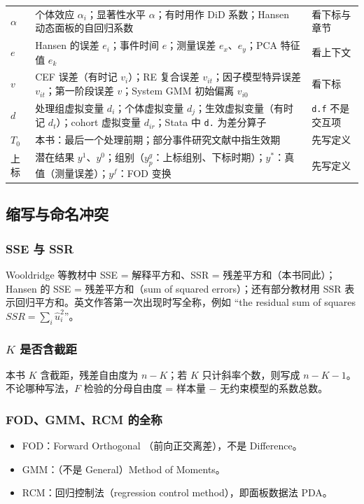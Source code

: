 {\begin{longtable}{@{}>{\raggedright\arraybackslash\small}p{1.3cm}>{\raggedright\arraybackslash\small}p{10.0cm}>{\raggedright\arraybackslash\small}p{3.8cm}@{}}
$\alpha$ & 个体效应 $\alpha_i$；显著性水平 $\alpha$；有时用作 DiD 系数；Hansen 动态面板的自回归系数 & 看下标与章节\\
\addlinespace[1pt]
$e$ & Hansen 的误差 $e_i$；事件时间 $e$；测量误差 $e_x$、$e_y$；PCA 特征值 $e_k$ & 看上下文\\
\addlinespace[1pt]
$v$ & CEF 误差（有时记 $v_i$）；RE 复合误差 $v_{it}$；因子模型特异误差 $v_{it}$；第一阶段误差 $v$；System GMM 初始偏离 $v_{i0}$ & 看下标\\
\addlinespace[1pt]
$d$ & 处理组虚拟变量 $d_i$；个体虚拟变量 $d_j$；生效虚拟变量（有时记 $d_t$）；cohort 虚拟变量 $d_{ir}$；Stata 中 \texttt{d.} 为差分算子 & \texttt{d.f} 不是交互项\\
\addlinespace[1pt]
$T_0$ & 本书：最后一个处理前期；部分事件研究文献中指生效期 & 先写定义\\
\addlinespace[1pt]
上标 & 潜在结果 $y^1$、$y^0$；组别（$y^g_p$：上标组别、下标时期）；$y^*$：真值（测量误差）；$y^f$：FOD 变换 & 先写定义\\
\end{longtable}}


\subsection{缩写与命名冲突}

\subsubsection{SSE 与 SSR}
Wooldridge 等教材中 SSE = 解释平方和、SSR = 残差平方和（本书同此）；Hansen 的 SSE = 残差平方和（sum of squared errors）；还有部分教材用 SSR 表示回归平方和。英文作答第一次出现时写全称，例如 “the residual sum of squares $SSR=\sum_i\hat u_i^2$”。

\subsubsection{\texorpdfstring{$K$}{K} 是否含截距}
本书 $K$ 含截距，残差自由度为 $n-K$；若 $K$ 只计斜率个数，则写成 $n-K-1$。不论哪种写法，$F$ 检验的分母自由度 = 样本量 $-$ 无约束模型的系数总数。

\subsubsection{FOD、GMM、RCM 的全称}
\begin{itemize}
  \item FOD：Forward Orthogonal （前向正交离差），不是 Difference。
  \item GMM：（不是 General）Method of Moments。
  \item RCM：回归控制法（regression control method），即面板数据法 PDA。
\end{itemize}


